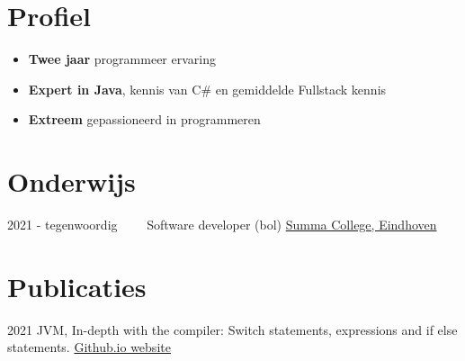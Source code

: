 \documentclass[letterpaper]{twentysecondcv} %
\begin{document}
\makesidebarFirst %

\section{Profiel}

\begin{itemize}
	\item \textbf{Twee jaar} programmeer ervaring
	\item \textbf{Expert in Java}, kennis van C\# en gemiddelde Fullstack kennis
	\item \textbf{Extreem} gepassioneerd in programmeren
\end{itemize}

\vspace{6mm}


\section{Onderwijs}

\begin{twenty} %
	\twentyitem
    	{2021 - tegenwoordig~~~~}
        {}
        {Software developer (bol)}
        {\href{https://www.summacollege.nl/}{Summa College, Eindhoven}}
        {}
        {}
\end{twenty}



\section{Publicaties}
\begin{twenty} %
	\twentyitem
    		{2021}
		        {}
        		{JVM, In-depth with the compiler: Switch statements, expressions and if else statements.}
        		{\href{https://tais993.github.io/article}{Github.io website}}
        		{}
        		{}
\end{twenty}
\end{document}
